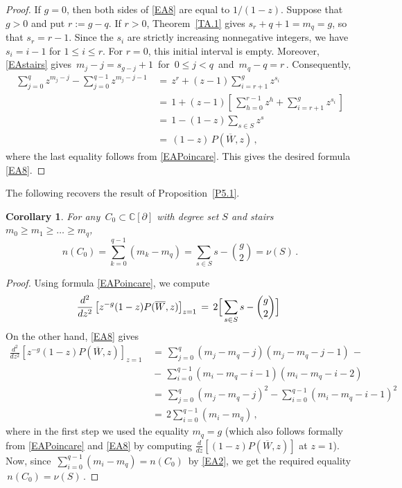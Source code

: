 \documentclass[11pt,reqno]{amsart}
\theoremstyle{plain}
\newtheorem{corollary}{Corollary}[section]
\theoremstyle{definition}
\theoremstyle{remark}
\numberwithin{equation}{section}
\newcommand{\C}{\mathbb{C}}
\begin{document}
\begin{proof}
If $g=0$, then both sides of \eqref{EA8} are equal to $1/(1-z)$. Suppose that $g>0$ and put $r:=g-q$.
If $r>0$,
Theorem~\ref{TA.1} gives
$s_r+q+1=m_q=g$, so that $s_r=r-1$. Since the $s_i$ are strictly increasing nonnegative
integers, we have $s_i=i-1$ for $1\le i\le r$. For $r=0$, this initial interval is empty.
Moreover, \eqref{EAstairs} gives $\,  m_j-j=s_{g-j}+1\,$ for $\,0\le j<q\,$ and $\,m_q-q=r\,$.
Consequently, 
\begin{align*}
  \sum_{j=0}^{q}z^{m_j-j}-\sum_{j=0}^{q-1}z^{m_j-j-1}
  & \,=\, z^r+(z-1)\sum_{i=r+1}^{g}z^{s_i} \\
  &\,=\, 1+(z-1)\left[\,\sum_{h=0}^{r-1}z^h+
       \sum_{i=r+1}^{g}z^{s_i}\,\right] \\
  &\,=\, 1-(1-z)\sum_{s\in S}z^s \\
  &\,=\, (1-z)\,P(\overline{W}, z)\,,
\end{align*}
%
where the last equality follows from \eqref{EAPoincare}.
This gives the desired formula \eqref{EA8}.
\end{proof}

The following recovers the result of Proposition~\ref{P5.1}.
\begin{corollary}
\label{CA.1}
For  any $\,C_0 \subset \C[\partial] $ with degree set $S$ and stairs $m_0 \ge m_1 \ge \ldots \ge m_q $, 
\[
  n(C_0) = \sum_{k=0}^{q-1}(m_k-m_q)
  = \sum_{s\in S}s-\binom{g}{2} = \nu(S)\,.
  \]
\end{corollary}
\begin{proof}
Using formula \eqref{EAPoincare}, we compute 
%
$$
\frac{d^2}{dz^2}\left[z^{-g}(1-z)P(\overline{W},z)\right]_{z=1} \,=\,
2 \Bigl[\, \sum_{s \in S} s -
  \binom{g}{2} \Bigr] \,\,
$$
%
On the other hand, \eqref{EA8} gives 
%
\begin{align*}
\frac{d^2}{dz^2}\left[z^{-g}(1-z)P(\overline{W},z)\right]_{z=1} &\,=\, 
\sum_{j=0}^{q} (m_j - m_q - j)(m_j - m_q - j-1)\,- \\
&\,-\, \sum_{i=0}^{q-1} (m_i - m_q - i -1)(m_i - m_q - i-2)\\
&\,=\, \sum_{j=0}^{q} (m_j - m_q - j)^2 - \sum_{i=0}^{q-1} (m_i - m_q - i - 1)^2 \\
&\,=\,2  \sum_{i=0}^{q-1} (m_i - m_q)\,,
\end{align*}
%
where in the first step we used the equality $ m_q = g $ (which also follows formally from 
\eqref{EAPoincare} and  \eqref{EA8} by computing $ \frac{d}{dz}[(1-z) P(\overline{W},z)]$ at $ z=1$). Now,  since $\,\sum_{i=0}^{q-1} (m_i - m_q) = n(C_0)\,$ by \eqref{EA2}, we get 
the required equality $\,n(C_0) = \nu(S)\,$.
\end{proof}
\end{document}
